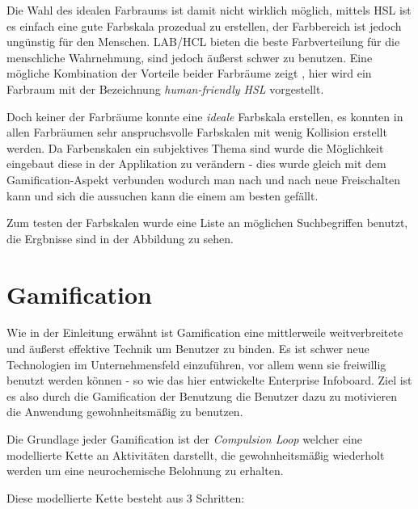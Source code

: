 \documentclass[12pt,twoside]{book}
\begin{document}
Die Wahl des idealen Farbraums ist damit nicht wirklich möglich, mittels HSL ist es einfach eine gute Farbskala prozedual zu erstellen, der Farbbereich ist jedoch ungünstig für den Menschen. LAB/HCL bieten die beste Farbverteilung für die menschliche Wahrnehmung, sind jedoch äußerst schwer zu benutzen. Eine mögliche Kombination der Vorteile beider Farbräume zeigt \citep{husl}, hier wird ein Farbraum mit der Bezeichnung \textit{human-friendly HSL} vorgestellt.

Doch keiner der Farbräume konnte eine \textit{ideale} Farbskala erstellen, es konnten in allen Farbräumen sehr anspruchsvolle Farbskalen mit wenig Kollision erstellt werden. Da Farbenskalen ein subjektives Thema sind wurde die Möglichkeit eingebaut diese in der Applikation zu verändern - dies wurde gleich mit dem Gamification-Aspekt verbunden wodurch man nach und nach neue Freischalten kann und sich die aussuchen kann die einem am besten gefällt.

Zum testen der Farbskalen wurde eine Liste an möglichen Suchbegriffen benutzt, die Ergbnisse sind in der Abbildung zu sehen.


\section{Gamification}

Wie in der Einleitung erwähnt ist Gamification eine mittlerweile weitverbreitete und äußerst effektive Technik um Benutzer zu binden. Es ist schwer neue Technologien im Unternehmensfeld einzuführen, vor allem wenn sie freiwillig benutzt werden können - so wie das hier entwickelte Enterprise Infoboard. Ziel ist es also durch die Gamification der Benutzung die Benutzer dazu zu motivieren die Anwendung gewohnheitsmäßig zu benutzen.

Die Grundlage jeder Gamification ist der \textit{Compulsion Loop} welcher eine modellierte Kette an Aktivitäten darstellt, die gewohnheitsmäßig wiederholt werden um eine neurochemische Belohnung zu erhalten.

Diese modellierte Kette besteht aus 3 Schritten:
\end{document}
